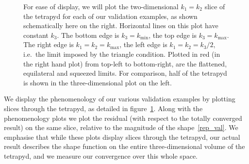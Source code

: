 \documentclass[a4paper,12pt]{extarticle}
\newcommand{\kmin}{{k_\text{min}}}
\newcommand{\kmax}{{k_\text{max}}}
\begin{document}
\begin{figure}[!pth]
\centering
\caption{
    For ease of display, we will plot the two-dimensional $k_1=k_2$ slice of the tetrapyd
    for each of our validation examples, as shown schematically here on the right.
    Horizontal lines on this plot have
    constant $k_3$. The bottom edge is $k_3=\kmin$, the top
    edge is $k_3=\kmax$. The right edge is $k_1=k_2=\kmax$, the
    left edge is $k_1=k_2=k_3/2$, i.e.\ the limit imposed by the triangle condition.
    Plotted in red (in the right hand plot) from top-left to bottom-right,
    are the flattened, equilateral and squeezed limits. For comparison,
    half of the tetrapyd is shown in the three-dimensional plot on the left.
}\label{slice_explained}
\end{figure}


We display the phenomenology of our various validation examples
by plotting slices through the tetrapyd, as detailed in figure~\ref{slice_explained}.
Along with the phenomenology plots we plot the residual
(with respect to the totally converged result)
on the same slice, relative to the magnitude of the shape~\eqref{rep_val}.
We emphasise that while these plots display slices through the
tetrapyd, our actual result describes the shape function on the
entire three-dimensional volume of the tetrapyd, and
we measure our convergence over this whole space.
\end{document}
